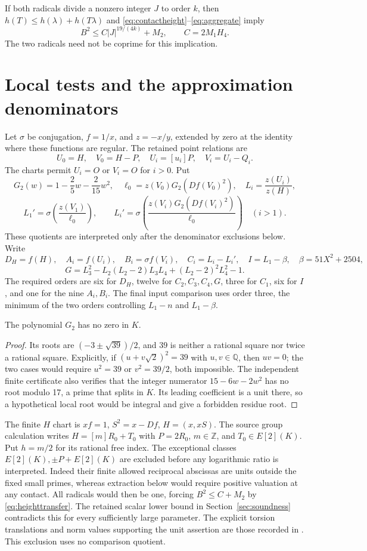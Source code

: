 \documentclass[11pt,a4paper]{article}
\newcommand{\Q}{\mathbb Q}\newcommand{\Z}{\mathbb Z}\newcommand{\HH}{\mathcal H}
\begin{document}
If both radicals divide a nonzero integer $J$ to order $k$, then
$h(T)\le h(\lambda)+h(T\lambda)$ and
\eqref{eq:contactheight}--\eqref{eq:aggregate} imply
\begin{equation}\label{eq:heighttransfer}
 B^2\le C|J|^{19/(4k)}+M_2,\qquad C=2M_1H_4.
\end{equation}
The two radicals need not be coprime for this implication.

\section{Local tests and the approximation denominators}
Let $\sigma$ be conjugation, $f=1/x$, and $z=-x/y$, extended by zero
at the identity where these functions are regular. The retained
point relations are
\[
 U_0=H,\quad V_0=H-P,\quad U_i=[u_i]P,\quad V_i=U_i-Q_i.
\]
The charts permit $U_i=O$ or $V_i=O$ for $i>0$.
Put
\[
 G_2(w)=1-\frac25w-\frac2{15}w^2,
 \quad \ell_0=z(V_0)G_2(Df(V_0)^2),\quad
 L_i=\frac{z(U_i)}{z(H)},
\]
\[
 L_1'=\sigma\!\left(\frac{z(V_1)}{\ell_0}\right),\qquad
 L_i'=\sigma\!\left(\frac{z(V_i)G_2(Df(V_i)^2)}{\ell_0}\right)\quad(i>1).
\]
These quotients are interpreted only after the denominator exclusions
below. Write
\[
 D_H=f(H),\quad A_i=f(U_i),\quad B_i=\sigma f(V_i),\quad
 C_i=L_i-L_i',\quad I=L_1-\beta,\quad \beta=51X^2+2504,
\]
\[
 G=L_3^2-L_2(L_2-2)L_3L_4+(L_2-2)^2L_4^2-1.
\]
The required orders are six for $D_H$, twelve for $C_2,C_3,C_4,G$,
three for $C_1$, six for $I$, and one for the nine $A_i,B_i$.
The final input comparison uses order three, the minimum of the two
orders controlling $L_1-n$ and $L_1-\beta$.

\begin{lemma}\label{lem:g2}
The polynomial $G_2$ has no zero in $K$.
\end{lemma}
\begin{proof}
Its roots are $(-3\pm\sqrt{39})/2$, and $39$ is neither a rational
square nor twice a rational square. Explicitly, if
$(u+v\sqrt2)^2=39$ with $u,v\in\Q$, then $uv=0$; the two cases
would require $u^2=39$ or $v^2=39/2$, both impossible.
The independent finite certificate also verifies that the integer
numerator $15-6w-2w^2$ has no root modulo 17, a prime that splits in
$K$. Its leading coefficient is a unit there, so a hypothetical local
root would be integral and give a forbidden residue root.
\end{proof}

The finite $H$ chart is $xf=1$, $S^2=x-Df$, $H=(x,xS)$.
The source group calculation writes $H=[m]R_0+T_0$ with $P=2R_0$,
$m\in\Z$, and $T_0\in E[2](K)$. Put $h=m/2$ for its rational
free index. The exceptional classes $E[2](K),\pm P+E[2](K)$ are
excluded before any logarithmic ratio is interpreted. Indeed their
finite allowed reciprocal abscissas are units outside the fixed small
primes, whereas extraction below would require positive valuation
at any contact. All radicals would then be one, forcing
$B^2\le C+M_2$ by \eqref{eq:heighttransfer}. The retained scalar
lower bound in Section~\ref{sec:soundness} contradicts this for every
sufficiently large parameter. The explicit torsion translations and
norm values supporting the unit assertion are those recorded in
\cite[Section 3]{Even}. This exclusion uses no comparison quotient.
\end{document}
